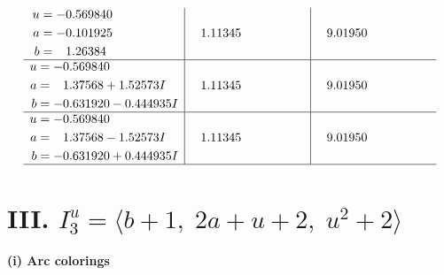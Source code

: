 \documentclass[1p]{elsarticle_modified}
\theoremstyle{definition}
\begin{document}
$$\begin{array}{c|c|c}
\begin{aligned}
u &= -0.569840\phantom{ +0.000000I} \\
a &= -0.101925\phantom{ +0.000000I} \\
b &= \phantom{-}1.26384\phantom{ +0.000000I}\end{aligned}
 & \phantom{-}1.11345\phantom{ +0.000000I} & \phantom{-}9.01950\phantom{ +0.000000I} \\ \hline\begin{aligned}
u &= -0.569840\phantom{ +0.000000I} \\
a &= \phantom{-}1.37568 + 1.52573 I \\
b &= -0.631920 - 0.444935 I\end{aligned}
 & \phantom{-}1.11345\phantom{ +0.000000I} & \phantom{-}9.01950\phantom{ +0.000000I} \\ \hline\begin{aligned}
u &= -0.569840\phantom{ +0.000000I} \\
a &= \phantom{-}1.37568 - 1.52573 I \\
b &= -0.631920 + 0.444935 I\end{aligned}
 & \phantom{-}1.11345\phantom{ +0.000000I} & \phantom{-}9.01950\phantom{ +0.000000I}\\
 \hline 
 \end{array}$$\newpage\newpage\renewcommand{\arraystretch}{1}
\centering \section*{III. $I^u_{3}= \langle b+1,\;2 a+u+2,\;u^2+2 \rangle$}
\flushleft \textbf{(i) Arc colorings}\\
\end{document}
